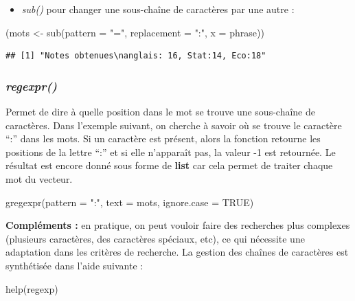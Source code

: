 \documentclass[
]{book}
\newenvironment{Shaded}{\begin{snugshade}}{\end{snugshade}}
\newcommand{\AttributeTok}[1]{\textcolor[rgb]{0.77,0.63,0.00}{#1}}
\newcommand{\ConstantTok}[1]{\textcolor[rgb]{0.00,0.00,0.00}{#1}}
\newcommand{\FunctionTok}[1]{\textcolor[rgb]{0.00,0.00,0.00}{#1}}
\newcommand{\NormalTok}[1]{#1}
\newcommand{\OtherTok}[1]{\textcolor[rgb]{0.56,0.35,0.01}{#1}}
\newcommand{\StringTok}[1]{\textcolor[rgb]{0.31,0.60,0.02}{#1}}
\providecommand{\tightlist}{%
  \setlength{\itemsep}{0pt}\setlength{\parskip}{0pt}}
\theoremstyle{definition}
\theoremstyle{definition}
\theoremstyle{definition}
\theoremstyle{definition}
\theoremstyle{remark}
\begin{document}
\begin{itemize}
\tightlist
\item
  \emph{sub()} pour changer une sous-chaîne de caractères par une autre :
\end{itemize}

\begin{Shaded}
\begin{Highlighting}[]
\NormalTok{(mots }\OtherTok{\textless{}{-}} \FunctionTok{sub}\NormalTok{(}\AttributeTok{pattern =} \StringTok{"="}\NormalTok{, }\AttributeTok{replacement =} \StringTok{":"}\NormalTok{, }\AttributeTok{x =}\NormalTok{ phrase))}
\end{Highlighting}
\end{Shaded}

\begin{verbatim}
## [1] "Notes obtenues\nanglais: 16, Stat:14, Eco:18"
\end{verbatim}

\hypertarget{regexpr}{%
\subsubsection{\texorpdfstring{\emph{regexpr()}}{regexpr()}}\label{regexpr}}

Permet de dire à quelle position dans le mot se trouve une sous-chaîne de caractères. Dans l'exemple suivant, on cherche à savoir où se trouve le caractère ``:'' dans les mots. Si un caractère est présent, alors la fonction retourne les positions de la lettre ``:'' et si elle n'apparaît pas, la valeur -1 est retournée. Le résultat est encore donné sous forme de \textbf{list} car cela permet de traiter chaque mot du vecteur.

\begin{Shaded}
\begin{Highlighting}[]
\FunctionTok{gregexpr}\NormalTok{(}\AttributeTok{pattern =} \StringTok{":"}\NormalTok{, }\AttributeTok{text =}\NormalTok{ mots, }\AttributeTok{ignore.case =} \ConstantTok{TRUE}\NormalTok{)}
\end{Highlighting}
\end{Shaded}

\textbf{Compléments :} en pratique, on peut vouloir faire des recherches plus complexes (plusieurs caractères, des caractères spéciaux, etc), ce qui nécessite une adaptation dans les critères de recherche. La gestion des chaînes de caractères est synthétisée dans l'aide suivante :

\begin{Shaded}
\begin{Highlighting}[]
\FunctionTok{help}\NormalTok{(regexp)}
\end{Highlighting}
\end{Shaded}
\end{document}
